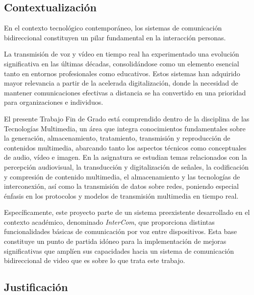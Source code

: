 \label{sec:justificacion_y_objetivos}

\subsection{Contextualización}

En el contexto tecnológico contemporáneo, los sistemas de comunicación bidireccional constituyen un pilar fundamental en la interacción personas. 

\vspace{\baselineskip}

La transmisión de voz y vídeo en tiempo real ha experimentado una evolución significativa en las últimas décadas, consolidándose como un elemento esencial tanto en entornos profesionales como educativos. Estos sistemas han adquirido mayor relevancia a partir de la acelerada digitalización, donde la necesidad de mantener comunicaciones efectivas a distancia se ha convertido en una prioridad para organizaciones e individuos.

\vspace{\baselineskip}
El presente Trabajo Fin de Grado está comprendido dentro de la disciplina de las Tecnologías Multimedia, un área que integra conocimientos fundamentales sobre la generación, almacenamiento, tratamiento, transmisión y reproducción de contenidos multimedia, abarcando tanto los aspectos técnicos como conceptuales de audio, vídeo e imagen. En la asignatura se estudian temas relacionados con la percepción audiovisual, la transducción y digitalización de señales, la codificación y compresión de contenido multimedia, el almacenamiento y las tecnologías de interconexión, así como la transmisión de datos sobre redes, poniendo especial énfasis en los protocolos y modelos de transmisión multimedia en tiempo real. 

\vspace{\baselineskip}
Específicamente, este proyecto parte de un sistema preexistente desarrollado en el contexto académico, denominado \textit{InterCom}, que proporciona distintas funcionalidades básicas de comunicación por voz entre dispositivos. Esta base constituye un punto de partida idóneo para la implementación de mejoras significativas que amplíen sus capacidades hacia un sistema de comunicación bidireccional de video que es sobre lo que trata este trabajo.

\subsection{Justificación}


